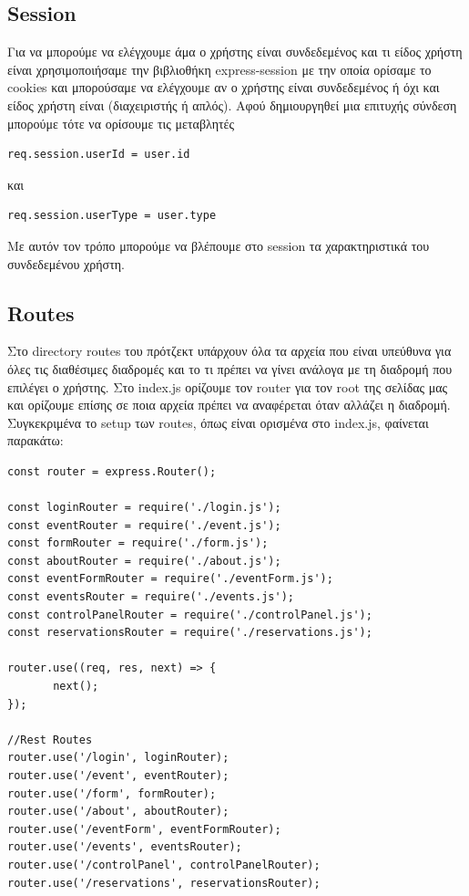 \documentclass{acmart}
\begin{document}
\subsection*{Session}
Για να μπορούμε να ελέγχουμε άμα ο χρήστης είναι συνδεδεμένος και τι είδος χρήστη είναι χρησιμοποιήσαμε την βιβλιοθήκη
express-session με την οποία ορίσαμε το cookies και μπορούσαμε να ελέγχουμε αν ο χρήστης είναι συνδεδεμένος ή όχι και 
είδος χρήστη είναι (διαχειριστής ή απλός).
Αφού δημιουργηθεί μια επιτυχής σύνδεση μπορούμε τότε να ορίσουμε τις μεταβλητές 
\begin{lstlisting}
req.session.userId = user.id
\end{lstlisting}
και
\begin{lstlisting}
req.session.userType = user.type
\end{lstlisting}
Με αυτόν τον τρόπο μπορούμε να βλέπουμε στο session τα χαρακτηριστικά του συνδεδεμένου χρήστη.
\subsection*{Routes}
Στο directory routes του πρότζεκτ υπάρχουν όλα τα αρχεία που είναι υπεύθυνα για όλες τις διαθέσιμες διαδρομές 
και το τι πρέπει να γίνει ανάλογα με τη διαδρομή που επιλέγει ο χρήστης.
Στο index.js ορίζουμε τον router για τον root της σελίδας μας και ορίζουμε επίσης σε ποια αρχεία πρέπει να αναφέρεται
όταν αλλάζει η διαδρομή.
Συγκεκριμένα το setup των routes, όπως είναι ορισμένα στο index.js, φαίνεται παρακάτω:
\begin{lstlisting}
const router = express.Router();

const loginRouter = require('./login.js');
const eventRouter = require('./event.js');
const formRouter = require('./form.js');
const aboutRouter = require('./about.js');
const eventFormRouter = require('./eventForm.js');
const eventsRouter = require('./events.js');
const controlPanelRouter = require('./controlPanel.js');
const reservationsRouter = require('./reservations.js');

router.use((req, res, next) => {
       next();
});

//Rest Routes
router.use('/login', loginRouter);
router.use('/event', eventRouter);
router.use('/form', formRouter);
router.use('/about', aboutRouter);
router.use('/eventForm', eventFormRouter);
router.use('/events', eventsRouter);
router.use('/controlPanel', controlPanelRouter);
router.use('/reservations', reservationsRouter);

\end{lstlisting}
\end{document}
